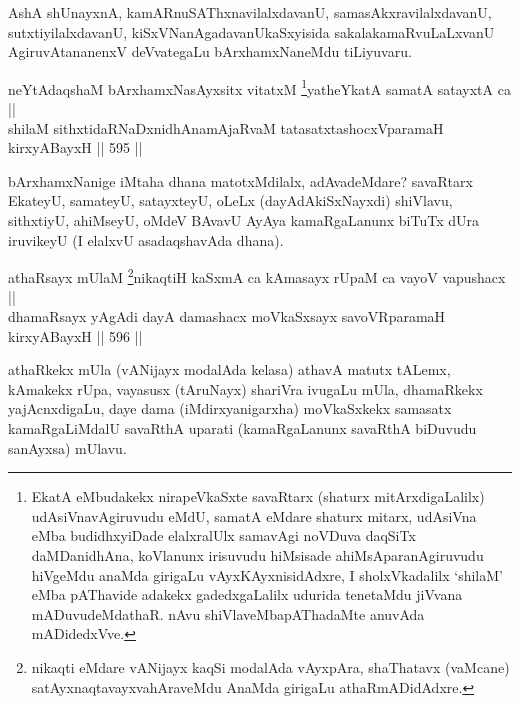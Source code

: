 \begin{artha}
AshA shUnayxnA, kamARnuSAThxnavilalxdavanU, samasAkxravilalxdavanU,
sutxtiyilalxdavanU, kiSxVNanAgadavanUkaSxyisida sakalakamaRvuLaLxvanU
AgiruvAtananenxV deVvategaLu bArxhamxNaneMdu tiLiyuvaru.
\end{artha}



\begin{shl}
neYtAdaqshaM bArxhamxNasAyxsitx vitatxM \footnote{EkatA eMbudakekx nirapeVkaSxte savaRtarx (shaturx
mitArxdigaLalilx) udAsiVnavAgiruvudu eMdU, samatA eMdare shaturx
mitarx, udAsiVna eMba budidhxyiDade elalxralUlx samavAgi noVDuva
daqSiTx daMDanidhAna, koVlanunx irisuvudu hiMsisade
ahiMsAparanAgiruvudu hiVgeMdu anaMda girigaLu vAyxKAyxnisidAdxre, I
sholxVkadalilx `shilaM' eMba pAThavide adakekx gadedxgaLalilx
udurida tenetaMdu jiVvana mADuvudeMdathaR. nAvu
shiVlaveMbapAThadaMte anuvAda mADidedxVve.}yatheYkatA samatA satayxtA ca || \\
shilaM sithxtidaRNaDxnidhAnamAjaRvaM tatasatxtashocxVparamaH kirxyABayxH \hfill || 595 ||  
\end{shl}

\begin{artha}
bArxhamxNanige iMtaha dhana matotxMdilalx, adAvadeMdare?
savaRtarx EkateyU, samateyU, satayxteyU, oLeLx (dayAdAkiSxNayxdi)
shiVlavu, sithxtiyU, ahiMseyU, oMdeV BAvavU AyAya kamaRgaLanunx biTuTx
dUra iruvikeyU  (I elalxvU asadaqshavAda dhana).
\end{artha}



\begin{shl}
athaRsayx mUlaM \footnote{nikaqti eMdare vANijayx kaqSi modalAda vAyxpAra, shaThatavx (vaMcane) satAyxnaqtavayxvahAraveMdu AnaMda girigaLu athaRmADidAdxre.}nikaqtiH kaSxmA ca kAmasayx rUpaM ca vayoV vapushacx || \\
dhamaRsayx yAgAdi dayA damashacx moVkaSxsayx savoVRparamaH kirxyABayxH \hfill || 596 ||  
\end{shl}

\begin{artha}
athaRkekx mUla (vANijayx modalAda kelasa) athavA matutx
tALemx, kAmakekx rUpa, vayasusx (tAruNayx) shariVra ivugaLu mUla,
dhamaRkekx yajAcnxdigaLu, daye dama (iMdirxyanigarxha) moVkaSxkekx
samasatx kamaRgaLiMdalU savaRthA uparati (kamaRgaLanunx savaRthA
biDuvudu sanAyxsa) mUlavu.
\end{artha}

